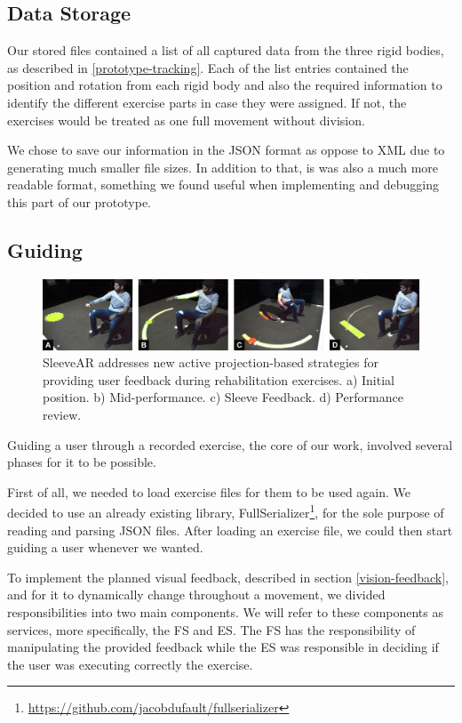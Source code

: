 \subsection{Data Storage}

Our stored files contained a list of all captured data from the three rigid bodies, as described in \ref{prototype-tracking}. 
Each of the list entries contained the position and rotation from each rigid body and also the required information to identify the different exercise parts in case they were assigned. 
If not, the exercises would be treated as one full movement without division.

We chose to save our information in the JSON format as oppose to XML due to generating much smaller file sizes. In addition to that, is was also a much more readable format, something we found useful when implementing and debugging this part of our prototype.

\subsection{Guiding}

\begin{figure}[!t]
    \begin{center}
        \includegraphics[width=\textwidth]{imgs/impl/teaser.jpg}
    \end{center}
    \caption{SleeveAR addresses new active projection-based strategies for providing user feedback during rehabilitation exercises. a) Initial position. b) Mid-performance. c) Sleeve Feedback. d) Performance review.}
    \label{fig:teaser}
\end{figure}

Guiding a user through a recorded exercise, the core of our work, involved several phases for it to be possible.

First of all, we needed to load exercise files for them to be used again. 
We decided to use an already existing library, FullSerializer\footnote{\url{https://github.com/jacobdufault/fullserializer}}, for the sole purpose of reading and parsing JSON files.
After loading an exercise file, we could then start guiding a user whenever we wanted.

To implement the planned visual feedback, described in section \ref{vision-feedback}, and for it to dynamically change throughout a movement, 
we divided responsibilities into two main components. We will refer to these components as services, more specifically, the \ac{FS} and \ac{ES}.
The \ac{FS} has the responsibility of manipulating the provided feedback while the \ac{ES} was responsible in deciding if the user was executing correctly the exercise.

